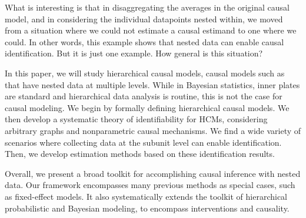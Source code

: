 \documentclass[12pt]{article}
\begin{document}
What is interesting is that in disaggregating the averages in the
original causal model, and in considering the individual datapoints
nested within, we moved from a situation where we could not
estimate a causal estimand to one where we could. In other words, this
example shows that nested data can enable causal identification. But it is
just one example. How general is this situation?

In this paper, we will study hierarchical causal models,
causal models such as  that have nested data at
multiple levels. 
While in Bayesian statistics, inner plates are standard and hierarchical data analysis is routine, this is not the case for causal modeling.
We begin by formally defining hierarchical causal models. We then develop a systematic theory of
identifiability for HCMs, considering arbitrary graphs and
nonparametric causal mechanisms. We find a wide variety of
scenarios where collecting data at the subunit level can enable
identification. Then, we develop estimation methods based on
these identification results. 

Overall, we present a broad toolkit for
accomplishing causal inference with nested data.
Our framework encompasses many previous methods as special cases, such as fixed-effect models.
It also systematically extends the toolkit of hierarchical probabilistic and Bayesian modeling, to encompass interventions and causality. 
\end{document}
